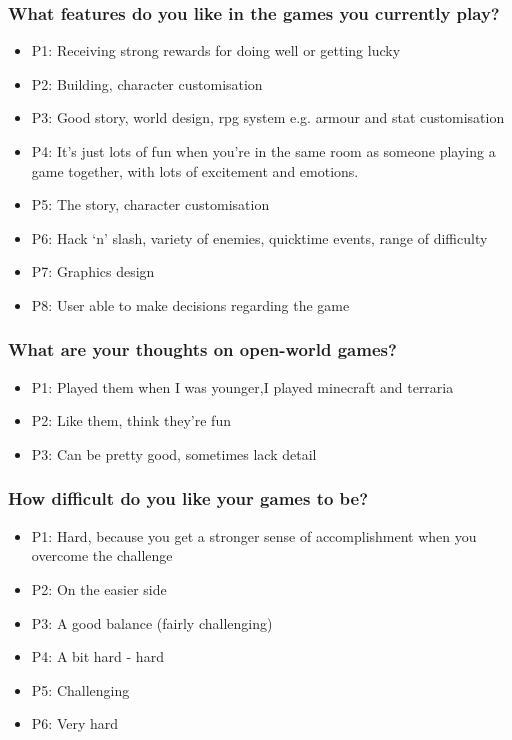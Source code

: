 \documentclass{article}
\begin{document}
\subsubsection*{What features do you like in the games you currently play?}
\begin{itemize}
	\item P1: Receiving strong rewards for doing well or getting lucky
	\item P2: Building, character customisation
	\item P3: Good story, world design, rpg system e.g. armour and stat customisation
	\item P4: It’s just lots of fun when  you’re in the same room as someone playing a game together, with lots of excitement and emotions.
	\item P5: The story, character customisation
	\item P6: Hack ‘n’ slash, variety of enemies, quicktime events, range of difficulty
	\item P7: Graphics design
	\item P8: User able to make decisions regarding the game
\end{itemize}

\subsubsection*{What are your thoughts on open-world games?}
\begin{itemize}
	\item P1: Played them when I was younger,I played minecraft and terraria
	\item P2: Like them, think they're fun
	\item P3: Can be pretty good, sometimes lack detail
\end{itemize}

\subsubsection*{How difficult do you like your games to be?}
\begin{itemize}
	\item P1: Hard, because you get a stronger sense of accomplishment when you overcome the challenge
	\item P2: On the easier side
	\item P3: A good balance (fairly challenging)
	\item P4: A bit hard - hard
	\item P5: Challenging
	\item P6: Very hard
\end{itemize}
\end{document}
